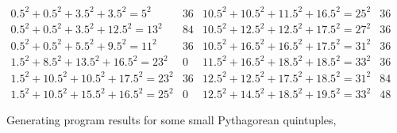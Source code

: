 \documentclass[12pt,table]{article}
\theoremstyle{definition}
\theoremstyle{remark}
\numberwithin{equation}{section}
\begin{document}
\begin{appendices}
\begin{figure}
\[\begin{array}{l|c||l|c}
%
0.5^2+ 0.5^2+ 3.5^2+ 3.5^2  = 5^2 &36&
10.5^2+ 10.5^2+ 11.5^2+ 16.5^2  = 25^2 &36\\
%
0.5^2+ 0.5^2+ 3.5^2+ 12.5^2  = 13^2 &84&
10.5^2+ 12.5^2+ 12.5^2+ 17.5^2  = 27^2 &36\\
%
0.5^2+ 0.5^2+ 5.5^2+ 9.5^2  = 11^2 &36&
10.5^2+ 16.5^2+ 16.5^2+ 17.5^2  = 31^2 &36\\
%
1.5^2+ 8.5^2+ 13.5^2+ 16.5^2  = 23^2 &0&
11.5^2+ 16.5^2+ 18.5^2+ 18.5^2  = 33^2 &36\\
%
1.5^2+ 10.5^2+ 10.5^2+ 17.5^2  = 23^2 &36&
12.5^2+ 12.5^2+ 17.5^2+ 18.5^2  = 31^2 &84\\
%
1.5^2+ 10.5^2+ 15.5^2+ 16.5^2  = 25^2 &0&
12.5^2+ 14.5^2+ 18.5^2+ 19.5^2  = 33^2 &48
\end{array}
\]
\caption{Generating program results for some small Pythagorean quintuples,}
\label{figure_quintuples}
\end{figure}



\end{appendices}
\end{document}
